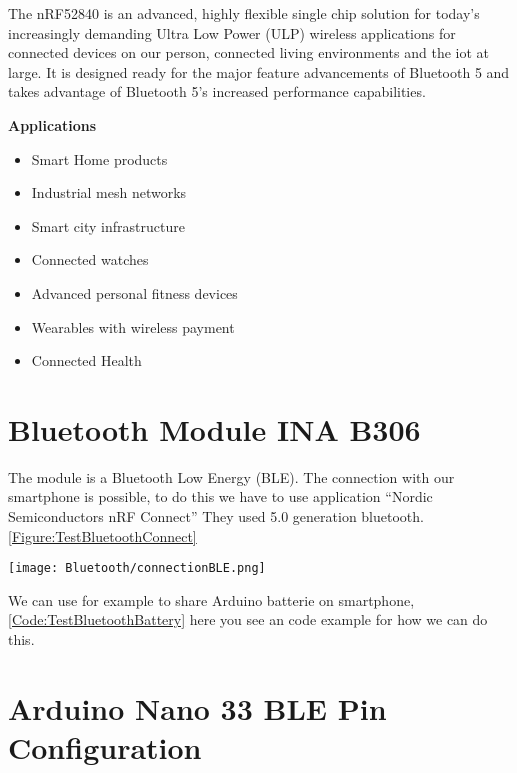The nRF52840 is an advanced, highly flexible single chip solution for today’s increasingly demanding Ultra Low Power (ULP) wireless applications for connected devices on our person, connected living environments and the \ac{iot} at large. It is designed ready for the major feature
advancements of Bluetooth 5 and takes advantage of Bluetooth 5's increased performance capabilities. \cite{Arduino:2021b}

\textbf{Applications}

\begin{itemize}
    \item Smart Home products
    \item Industrial mesh networks
    \item Smart city infrastructure
    \item Connected watches
    \item Advanced personal fitness devices
    \item Wearables with wireless payment
    \item Connected Health
\end{itemize}


\section{Bluetooth Module INA B306}

The module is a Bluetooth Low Energy (BLE). The connection with our smartphone is possible, to do this we have to use application ``Nordic Semiconductors nRF Connect'' They used 5.0 generation bluetooth. \ref{Figure:TestBluetoothConnect} 

\begin{center}
    \label{Figure:TestBluetoothConnect}
    \texttt{[image: Bluetooth/connectionBLE.png]}
\end{center}		

We can use for example to share Arduino batterie on smartphone, \ref{Code:TestBluetoothBattery} here you see an code example for how we can do this.

\begin{center}
    \label{Code:TestBluetoothBattery}
\end{center}




\section{Arduino Nano 33 BLE Pin Configuration}

